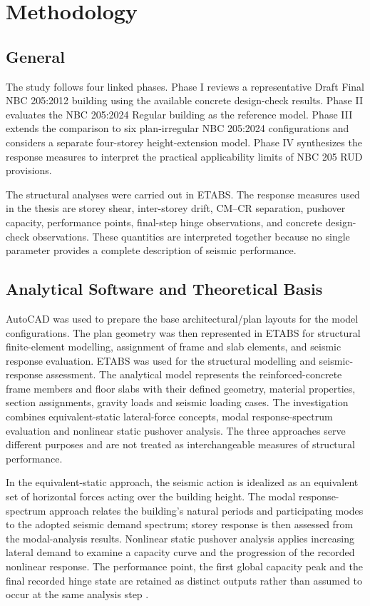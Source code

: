 \chapter[METHODOLOGY]{Methodology}

\section{General}
The study follows four linked phases. Phase I reviews a representative Draft Final NBC 205:2012 building using the available concrete design-check results. Phase II evaluates the NBC 205:2024 Regular building as the reference model. Phase III extends the comparison to six plan-irregular NBC 205:2024 configurations and considers a separate four-storey height-extension model. Phase IV synthesizes the response measures to interpret the practical applicability limits of NBC 205 RUD provisions.

The structural analyses were carried out in ETABS. The response measures used in the thesis are storey shear, inter-storey drift, CM--CR separation, pushover capacity, performance points, final-step hinge observations, and concrete design-check observations. These quantities are interpreted together because no single parameter provides a complete description of seismic performance.

\section{Analytical Software and Theoretical Basis}
AutoCAD was used to prepare the base architectural/plan layouts for the model configurations. The plan geometry was then represented in ETABS for structural finite-element modelling, assignment of frame and slab elements, and seismic response evaluation. ETABS was used for the structural modelling and seismic-response assessment. The analytical model represents the reinforced-concrete frame members and floor slabs with their defined geometry, material properties, section assignments, gravity loads and seismic loading cases. The investigation combines equivalent-static lateral-force concepts, modal response-spectrum evaluation and nonlinear static pushover analysis. The three approaches serve different purposes and are not treated as interchangeable measures of structural performance.

In the equivalent-static approach, the seismic action is idealized as an equivalent set of horizontal forces acting over the building height. The modal response-spectrum approach relates the building's natural periods and participating modes to the adopted seismic demand spectrum; storey response is then assessed from the modal-analysis results. Nonlinear static pushover analysis applies increasing lateral demand to examine a capacity curve and the progression of the recorded nonlinear response. The performance point, the first global capacity peak and the final recorded hinge state are retained as distinct outputs rather than assumed to occur at the same analysis step \cite{nbc105_2025,atc1996atc40,fema2005fema440}.

